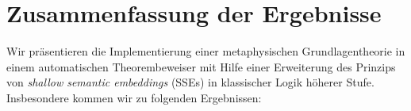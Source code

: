 \documentclass[a4paper,enabledeprecatedfontcommands,abstract=on,twoside=true]{scrreprt}
\numberwithin{TODO}{chapter}
\numberwithin{equation}{section}
\begin{document}

\appendix
{
\setcounter{secnumdepth}{3}

\setcounter{secnumdepth}{3}

\ttfamily
\footnotesize
\parindent0pt


% 
% 
% 
% 
% 
% 
% 
% 
% 
% 
% 
% 
}

\restoregeometry

\newpage

\printbibliography[heading=bibintoc]

\cleardoublepage

\pagestyle{plain}

\section*{Zusammenfassung der Ergebnisse}

Wir pr\"asentieren die Implementierung einer metaphysischen Grundlagentheorie in einem automatischen Theorembeweiser mit Hilfe einer Erweiterung des Prinzips von \emph{shallow semantic embeddings} (SSEs) in klassischer Logik h\"oherer Stufe. Insbesondere kommen wir zu folgenden Ergebnissen:
\end{document}
